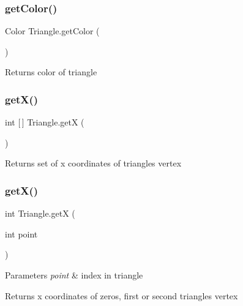 \subsubsection{\texorpdfstring{get\+Color()}{getColor()}}
{\footnotesize\ttfamily Color Triangle.\+get\+Color (\begin{DoxyParamCaption}{ }\end{DoxyParamCaption})\hspace{0.3cm}{\ttfamily [inline]}}

\begin{DoxyReturn}{Returns}
color of triangle 
\end{DoxyReturn}
\mbox{\label{classTriangle_a4bef2d535093c6674ebe06291b72c823}} 
\subsubsection{\texorpdfstring{get\+X()}{getX()}\hspace{0.1cm}{\footnotesize\ttfamily [1/2]}}
{\footnotesize\ttfamily int \mbox{[}$\,$\mbox{]} Triangle.\+getX (\begin{DoxyParamCaption}{ }\end{DoxyParamCaption})\hspace{0.3cm}{\ttfamily [inline]}}

\begin{DoxyReturn}{Returns}
set of x coordinates of triangle\textquotesingle{}s vertex 
\end{DoxyReturn}
\mbox{\label{classTriangle_a5a50f4cf54c6350b3e3bc8d239fe5b12}} 
\subsubsection{\texorpdfstring{get\+X()}{getX()}\hspace{0.1cm}{\footnotesize\ttfamily [2/2]}}
{\footnotesize\ttfamily int Triangle.\+getX (\begin{DoxyParamCaption}\item[{int}]{point }\end{DoxyParamCaption})\hspace{0.3cm}{\ttfamily [inline]}}


\begin{DoxyParams}{Parameters}
{\em point} & index in triangle \\
\hline
\end{DoxyParams}
\begin{DoxyReturn}{Returns}
x coordinates of zero\textquotesingle{}s, first or second triangle\textquotesingle{}s vertex 
\end{DoxyReturn}
\mbox{\label{classTriangle_ab03557892090f07ef3bc5bc4ec612f6a}} 
